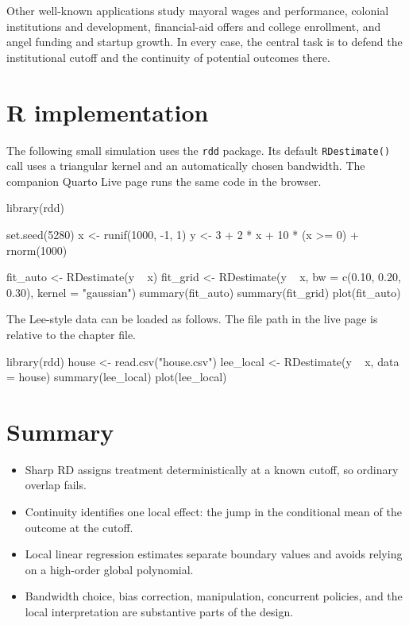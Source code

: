Other well-known applications study mayoral wages and performance, colonial
institutions and development, financial-aid offers and college enrollment, and
angel funding and startup growth.  In every case, the central task is to defend
the institutional cutoff and the continuity of potential outcomes there.

\section{R implementation}
\label{sec:rd-r}

The following small simulation uses the \texttt{rdd} package.  Its default
\texttt{RDestimate()} call uses a triangular kernel and an automatically chosen
bandwidth.  The companion Quarto Live page runs the same code in the browser.

\begin{rcode}
library(rdd)

set.seed(5280)
x <- runif(1000, -1, 1)
y <- 3 + 2 * x + 10 * (x >= 0) + rnorm(1000)

fit_auto <- RDestimate(y ~ x)
fit_grid <- RDestimate(y ~ x,
                       bw = c(0.10, 0.20, 0.30),
                       kernel = "gaussian")
summary(fit_auto)
summary(fit_grid)
plot(fit_auto)
\end{rcode}

The Lee-style data can be loaded as follows.  The file path in the live page is
relative to the chapter file.

\begin{rcode}
library(rdd)
house <- read.csv("house.csv")
lee_local <- RDestimate(y ~ x, data = house)
summary(lee_local)
plot(lee_local)
\end{rcode}

\section*{Summary}

\begin{itemize}
  \item Sharp RD assigns treatment deterministically at a known cutoff, so
        ordinary overlap fails.
  \item Continuity identifies one local effect: the jump in the conditional
        mean of the outcome at the cutoff.
  \item Local linear regression estimates separate boundary values and avoids
        relying on a high-order global polynomial.
  \item Bandwidth choice, bias correction, manipulation, concurrent policies,
        and the local interpretation are substantive parts of the design.
\end{itemize}
